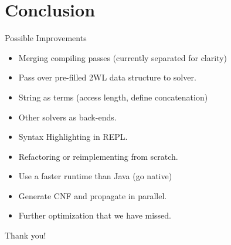 \documentclass[smaller,dvipsnames,ratio=169]{beamer}
\begin{document}
  \section{Conclusion}

  \begin{frame}{Possible Improvements}
  	\begin{itemize}
  		\item Merging compiling passes (currently separated for clarity)
  		\item Pass over pre-filled 2WL data structure to solver.
  		\item String as terms (access length, define concatenation)
  		\item Other solvers as back-ends.
  		\item Syntax Highlighting in REPL.
  		\item Refactoring or reimplementing from scratch.
  		\item Use a faster runtime than Java (go native)
  		\item Generate CNF and propagate in parallel.
   		\item Further optimization that we have missed.
  	\end{itemize}
  \end{frame}

  \begin{frame}[standout]
    Thank you!
  \end{frame}
\end{document}
